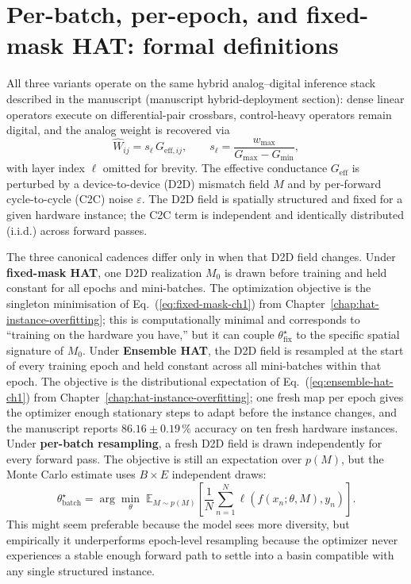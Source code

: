 \section{Per-batch, per-epoch, and fixed-mask HAT: formal definitions}
\label{sec:cadence-definitions}

All three variants operate on the same hybrid analog--digital inference stack described in the manuscript (manuscript hybrid-deployment section): dense linear operators execute on differential-pair crossbars, control-heavy operators remain digital, and the analog weight is recovered via
\begin{equation}
    \hat{W}_{ij} = s_{\ell}\,G_{\mathrm{eff},ij},
    \qquad
    s_{\ell}=\frac{w_{\max}}{G_{\max}-G_{\min}},
\label{eq:scale-recovery-ch3}
\end{equation}
with layer index $\ell$ omitted for brevity. The effective conductance $G_{\mathrm{eff}}$ is perturbed by a device-to-device (D2D) mismatch field $M$ and by per-forward cycle-to-cycle (C2C) noise $\varepsilon$. The D2D field is spatially structured and fixed for a given hardware instance; the C2C term is independent and identically distributed (i.i.d.) across forward passes.

The three canonical cadences differ only in when that D2D field changes.  Under \textbf{fixed-mask HAT}, one D2D realization $M_{0}$ is drawn before training and held constant for all epochs and mini-batches.  The optimization objective is the singleton minimisation of Eq.~(\ref{eq:fixed-mask-ch1}) from Chapter~\ref{chap:hat-instance-overfitting}; this is computationally minimal and corresponds to ``training on the hardware you have,'' but it can couple $\theta_{\mathrm{fix}}^{\star}$ to the specific spatial signature of $M_{0}$.  Under \textbf{Ensemble HAT}, the D2D field is resampled at the start of every training epoch and held constant across all mini-batches within that epoch.  The objective is the distributional expectation of Eq.~(\ref{eq:ensemble-hat-ch1}) from Chapter~\ref{chap:hat-instance-overfitting}; one fresh map per epoch gives the optimizer enough stationary steps to adapt before the instance changes, and the manuscript reports $86.16\pm0.19\,\%$ accuracy on ten fresh hardware instances.  Under \textbf{per-batch resampling}, a fresh D2D field is drawn independently for every forward pass.  The objective is still an expectation over $p(M)$, but the Monte Carlo estimate uses $B\times E$ independent draws:
\begin{equation}
    \theta_{\mathrm{batch}}^{\star}=\arg\min_{\theta}\;\mathbb{E}_{M\sim p(M)}\!\left[\frac{1}{N}\sum_{n=1}^{N}\ell\!\left(f(x_{n};\theta,M),y_{n}\right)\right].
\label{eq:hat-batch}
\end{equation}
This might seem preferable because the model sees more diversity, but empirically it underperforms epoch-level resampling because the optimizer never experiences a stable enough forward path to settle into a basin compatible with any single structured instance.

